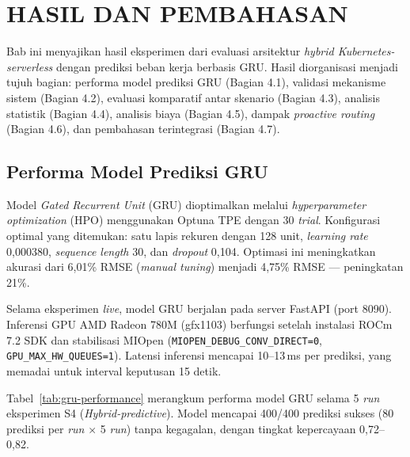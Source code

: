 
\chapter{HASIL DAN PEMBAHASAN}
\label{sec:hasil-dan-pembahasan}

Bab ini menyajikan hasil eksperimen dari evaluasi arsitektur \emph{hybrid Kubernetes-serverless} dengan prediksi beban kerja berbasis GRU. Hasil diorganisasi menjadi tujuh bagian: performa model prediksi GRU (Bagian 4.1), validasi mekanisme sistem (Bagian 4.2), evaluasi komparatif antar skenario (Bagian 4.3), analisis statistik (Bagian 4.4), analisis biaya (Bagian 4.5), dampak \emph{proactive routing} (Bagian 4.6), dan pembahasan terintegrasi (Bagian 4.7).

\section{Performa Model Prediksi GRU}
\label{sec:gru-performance}

Model \emph{Gated Recurrent Unit} (GRU) dioptimalkan melalui \emph{hyperparameter optimization} (HPO) menggunakan Optuna TPE dengan 30 \emph{trial}. Konfigurasi optimal yang ditemukan: satu lapis rekuren dengan 128 unit, \emph{learning rate} 0,000380, \emph{sequence length} 30, dan \emph{dropout} 0,104. Optimasi ini meningkatkan akurasi dari 6,01\% RMSE (\emph{manual tuning}) menjadi 4,75\% RMSE — peningkatan 21\%.

Selama eksperimen \emph{live}, model GRU berjalan pada server FastAPI (port 8090). Inferensi GPU AMD Radeon 780M (gfx1103) berfungsi setelah instalasi ROCm 7.2 SDK dan stabilisasi MIOpen (\texttt{MIOPEN\_DEBUG\_CONV\_DIRECT=0}, \texttt{GPU\_MAX\_HW\_QUEUES=1}). Latensi inferensi mencapai 10--13\,ms per prediksi, yang memadai untuk interval keputusan 15 detik.

Tabel~\ref{tab:gru-performance} merangkum performa model GRU selama 5 \emph{run} eksperimen S4 (\emph{Hybrid-predictive}). Model mencapai 400/400 prediksi sukses (80 prediksi per \emph{run} $\times$ 5 \emph{run}) tanpa kegagalan, dengan tingkat kepercayaan 0,72--0,82.

